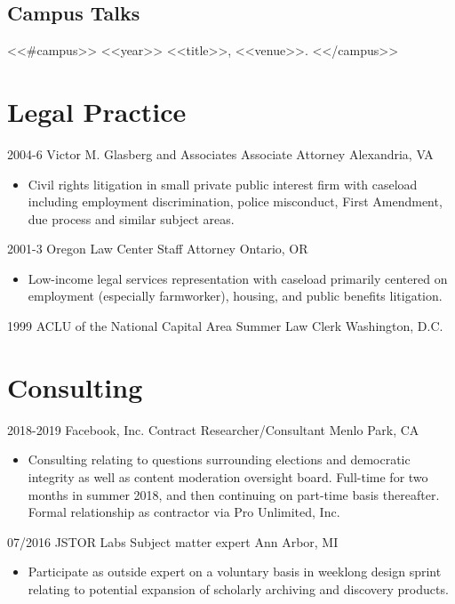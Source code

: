 \documentclass[letterpaper]{moderncv}
\begin{document}
\subsection{Campus Talks}
<<#campus>>
\cvitem
{<<year>>}
{<<title>>, <<venue>>.}
\vspace{1mm}
<</campus>>

\section{Legal Practice}

\cventry
{2004-6}
{Victor M. Glasberg and Associates}
{Associate Attorney}
{Alexandria, VA}
{}
{\begin{itemize}%
	\item Civil rights litigation in small private public interest firm with caseload including employment discrimination,
    police misconduct, First Amendment, due process and similar subject areas.
	\end{itemize}}

\cventry
{2001-3}
{Oregon Law Center}
{Staff Attorney}
{Ontario, OR}
{}
{\begin{itemize}%
	\item Low-income legal services representation with caseload primarily centered on employment
    (especially farmworker), housing, and public benefits litigation.
	\end{itemize}}

\cventry
{1999}
{ACLU of the National Capital Area}
{Summer Law Clerk}
{Washington, D.C.}
{}
{}


\section{Consulting}

\cventry
{2018-2019}
{Facebook, Inc.}
{Contract Researcher/Consultant}
{Menlo Park, CA}
{}
{\begin{itemize}%
	\item Consulting relating to questions surrounding elections and democratic
    integrity as well as content moderation oversight board.
    Full-time for two months in summer 2018, and then continuing on
    part-time basis thereafter. Formal relationship
    as contractor via Pro Unlimited, Inc.
	\end{itemize}}

\cventry
{07/2016}
{JSTOR Labs}
{Subject matter expert}
{Ann Arbor, MI}
{}
{\begin{itemize}%
	\item Participate as outside expert on a voluntary basis in weeklong design
    sprint relating to potential expansion of scholarly archiving and discovery products.
	\end{itemize}}
\end{document}
